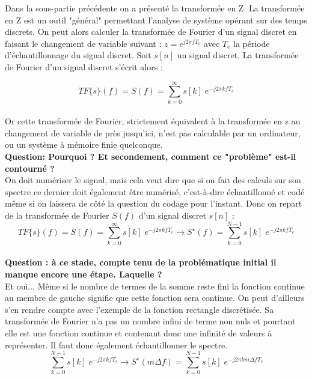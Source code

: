 \documentclass[11pt,a4paper]{article}
\begin{document}
Dans la sous-partie précédente on a présenté la transformée en Z. La transformée en Z est un outil "général" permettant l'analyse de système  opérant sur des temps discrets. On peut alors calculer la transformée de Fourier d'un signal discret en faisant le changement de variable suivant : $z = e^{j2\pi f T_e}$ avec $T_e$ la période d'échantillonnage du signal discret. Soit $s[n]$ un signal discret, La transformée de Fourier d'un signal discret s'écrit alors : 

\[ TF\lbrace s \rbrace(f) = S(f) = \sum_{k = 0}^{\infty} s[k] \; e^{-j 2 \pi k f T_e}\] \\

Or cette transformée de Fourier, strictement équivalent à la transformée en z au changement de variable de près jusqu'ici, n'est pas calculable par un ordinateur, ou un système à mémoire finie quelconque.\\

\textbf{Question: Pourquoi ? Et secondement,  comment ce "problème" est-il contourné ?}\\

On doit numériser le signal, mais cela veut dire que si on fait des calculs sur son spectre ce dernier doit également être numérisé, c'est-à-dire échantillonné et codé même si on laissera de côté la question du codage pour l'instant. Donc on repart de la transformée de Fourier $S(f)$ d'un signal discret $s[n]$ :\\

\[ TF\lbrace s \rbrace(f) = S(f) = \sum_{k = 0}^{\infty} s[k] \; e^{-j 2 \pi k f T_e} \rightarrow S^{\star} (f) =  \sum_{k = 0}^{N-1} s[k] \; e^{-j 2 \pi k f T_e} \]\\


\textbf{Question : à ce stade, compte tenu de la problématique initial il manque encore une étape. Laquelle ?}\\

Et oui... Même si le nombre de termes de la somme reste fini la fonction continue au membre de gauche signifie que cette fonction sera continue. On peut d'ailleurs s'en rendre compte avec l'exemple de la fonction rectangle discrétisée. Sa transformée de Fourier n'a pas un nombre infini de terme non nuls et pourtant elle est une fonction continue et contenant donc une infinité de valeurs à représenter. Il faut donc également échantillonner le spectre.\\

\[\sum_{k = 0}^{N-1} s[k] \; e^{-j 2 \pi k f T_e} \rightarrow S^{\star} (m \Delta f) = \sum_{k = 0}^{N-1} s[k] \; e^{-j 2 \pi k m \Delta f T_e} \]\\
\end{document}
